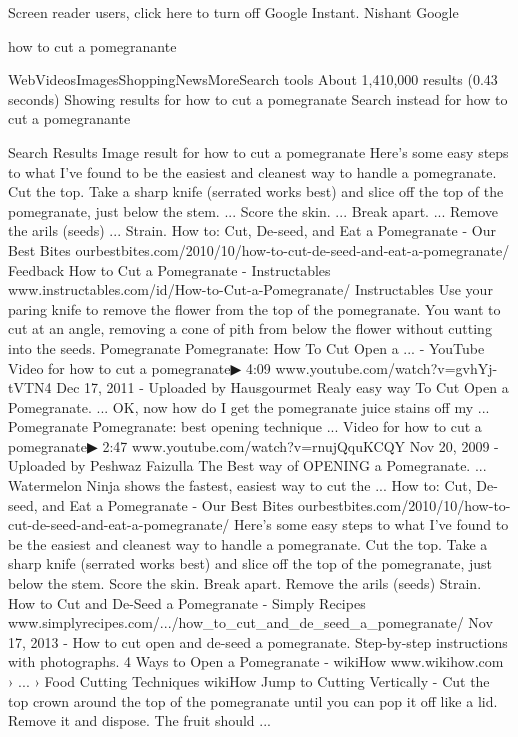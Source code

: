 Screen reader users, click here to turn off Google Instant.
Nishant
Google


how to cut a pomegranante


WebVideosImagesShoppingNewsMoreSearch tools
About 1,410,000 results (0.43 seconds) 
Showing results for how to cut a pomegranate
Search instead for how to cut a pomegranante

Search Results
Image result for how to cut a pomegranate
Here's some easy steps to what I've found to be the easiest and cleanest way to handle a pomegranate.
Cut the top. Take a sharp knife (serrated works best) and slice off the top of the pomegranate, just below the stem. ...
Score the skin. ...
Break apart. ...
Remove the arils (seeds) ...
Strain.
How to: Cut, De-seed, and Eat a Pomegranate - Our Best Bites
ourbestbites.com/2010/10/how-to-cut-de-seed-and-eat-a-pomegranate/
Feedback
How to Cut a Pomegranate - Instructables
www.instructables.com/id/How-to-Cut-a-Pomegranate/
Instructables
Use your paring knife to remove the flower from the top of the pomegranate. You want to cut at an angle, removing a cone of pith from below the flower without cutting into the seeds.
Pomegranate Pomegranate: How To Cut Open a ... - YouTube
Video for how to cut a pomegranate▶ 4:09
www.youtube.com/watch?v=gvhYj-tVTN4
Dec 17, 2011 - Uploaded by Hausgourmet
Realy easy way To Cut Open a Pomegranate. ... OK, now how do I get the pomegranate juice stains off my ...
Pomegranate Pomegranate: best opening technique ...
Video for how to cut a pomegranate▶ 2:47
www.youtube.com/watch?v=rnujQquKCQY
Nov 20, 2009 - Uploaded by Peshwaz Faizulla
The Best way of OPENING a Pomegranate. ... Watermelon Ninja shows the fastest, easiest way to cut the ...
How to: Cut, De-seed, and Eat a Pomegranate - Our Best Bites
ourbestbites.com/2010/10/how-to-cut-de-seed-and-eat-a-pomegranate/
Here's some easy steps to what I've found to be the easiest and cleanest way to handle a pomegranate. Cut the top. Take a sharp knife (serrated works best) and slice off the top of the pomegranate, just below the stem. Score the skin. Break apart. Remove the arils (seeds) Strain.
How to Cut and De-Seed a Pomegranate - Simply Recipes
www.simplyrecipes.com/.../how_to_cut_and_de_seed_a_pomegranate/
Nov 17, 2013 - How to cut open and de-seed a pomegranate. Step-by-step instructions with photographs.
4 Ways to Open a Pomegranate - wikiHow
www.wikihow.com › ... › Food Cutting Techniques
wikiHow
Jump to Cutting Vertically - Cut the top crown around the top of the pomegranate until you can pop it off like a lid. Remove it and dispose. The fruit should ...
